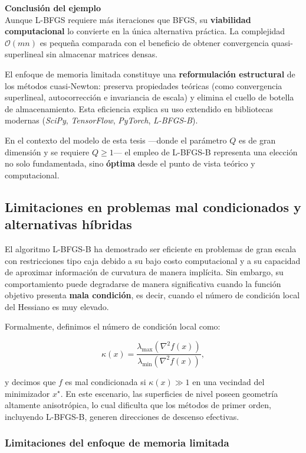 \documentclass[
  spanish,
  us-letterpaper,
  DIV=11,
  numbers=noendperiod]{scrreprt}
\numberwithin{equation}{section}
\begin{document}
\textbf{Conclusión del ejemplo}\\
Aunque L-BFGS requiere más iteraciones que BFGS, su \textbf{viabilidad
computacional} lo convierte en la única alternativa práctica. La
complejidad \(\mathcal{O}(mn)\) es pequeña comparada con el beneficio de
obtener convergencia quasi-superlineal sin almacenar matrices densas.

El enfoque de memoria limitada constituye una \textbf{reformulación
estructural} de los métodos cuasi-Newton: preserva propiedades teóricas
(como convergencia superlineal, autocorrección e invariancia de escala)
y elimina el cuello de botella de almacenamiento. Esta eficiencia
explica su uso extendido en bibliotecas modernas (\emph{SciPy},
\emph{TensorFlow}, \emph{PyTorch}, \emph{L-BFGS-B}).

En el contexto del modelo de esta tesis ---donde el parámetro \(Q\) es
de gran dimensión y se requiere \(Q \ge 1\)--- el empleo de L-BFGS-B
representa una elección no solo fundamentada, sino \textbf{óptima} desde
el punto de vista teórico y computacional.

\subsection{Limitaciones en problemas mal condicionados y alternativas
híbridas}\label{limitaciones-en-problemas-mal-condicionados-y-alternativas-huxedbridas}

El algoritmo L-BFGS-B ha demostrado ser eficiente en problemas de gran
escala con restricciones tipo caja debido a su bajo costo computacional
y a su capacidad de aproximar información de curvatura de manera
implícita. Sin embargo, su comportamiento puede degradarse de manera
significativa cuando la función objetivo presenta \textbf{mala
condición}, es decir, cuando el número de condición local del Hessiano
es muy elevado.

Formalmente, definimos el número de condición local como:

\[
\kappa(x) = \frac{\lambda_{\max}(\nabla^2 f(x))}{\lambda_{\min}(\nabla^2 f(x))},
\]

y decimos que \(f\) es mal condicionada si \(\kappa(x) \gg 1\) en una
vecindad del minimizador \(x^\star\). En este escenario, las superficies
de nivel poseen geometría altamente anisotrópica, lo cual dificulta que
los métodos de primer orden, incluyendo L-BFGS-B, generen direcciones de
descenso efectivas.

\subsubsection{Limitaciones del enfoque de memoria
limitada}\label{limitaciones-del-enfoque-de-memoria-limitada}
\end{document}
